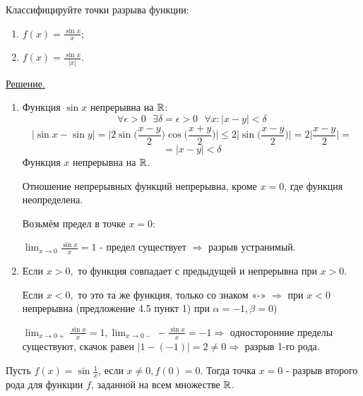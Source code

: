 	\begin{example}
		Классифицируйте точки разрыва функции:
		\begin{enumerate}
			\item $f(x) = \frac{\sin{x}}{x};$
			\item $f(x) = \frac{\sin{x}}{|x|}.$
		\end{enumerate}
	\end{example}
	
	\underline{Решение.}	
	\begin{enumerate}
		\item Функция $\sin{x}$ непрерывна на $\mathbb R$:
		\[ \forall \epsilon > 0 \text{ } \exists \delta = \epsilon > 0 \text{ } \forall x: |x - y| < \delta \]
		\[ |\sin{x} - \sin{y}| = \bigg|2\sin{\bigg(\frac{x - y}{2}\bigg)}\cos{\bigg(\frac{x + y}{2}\bigg)}\bigg| \leqslant 2\bigg|\sin{\bigg(\frac{x - y}{2}\bigg)}\bigg| = 2\bigg|\frac{x - y}{2}\bigg| = \]
		\[ = |x - y| < \delta \]
		Функция $x$ непрерывна на $\mathbb R$.
		
		Отношение непрерывных функций непрерывна, кроме $x = 0$, где функция неопределена.
		
		Возьмём предел в точке $x = 0$:
		
		$\lim_{x \to 0} \frac{\sin{x}}{x} = 1$ - предел существует $\Rightarrow$ разрыв устранимый.
		\item Если $x > 0,$ то функция совпадает с предыдущей и непрерывна при $x > 0$.
		
		Если $x < 0,$ то это та же функция, только со знаком «-» $\Rightarrow$ при $x < 0$ непрерывна (предложение 4.5 пункт 1) при $\alpha = -1, \beta = 0$)
		
		$\lim_{x \to 0+} \frac{\sin{x}}{x} = 1, \lim_{x \to 0-} -\frac{\sin{x}}{x} = -1 \Rightarrow$ односторонние пределы существуют, скачок равен $|1 - (-1)| = 2 \neq 0 \Rightarrow$ разрыв 1-го рода.
	\end{enumerate}
	
	\begin{example}
		Пусть $f(x) = \sin{\frac{1}{x}}$, если $x \neq 0, f(0) = 0$. Тогда точка $x = 0$ - разрыв второго рода для функции $f$, заданной на всем множестве $\mathbb R$.
	\end{example}
	
